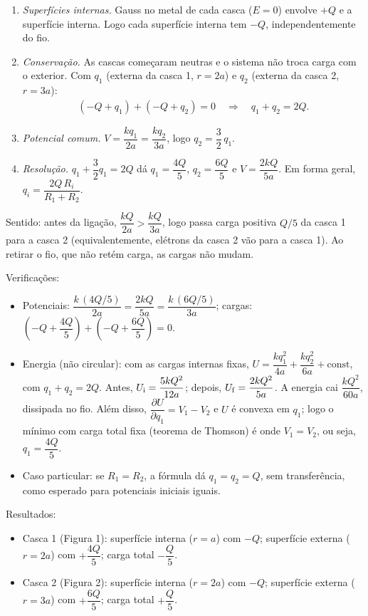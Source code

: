 \documentclass{article}%
\begin{document}
\begin{enumerate}
\item \emph{Superfícies internas.} Gauss no metal de cada casca ($E=0$) envolve $+Q$ e a superfície interna. Logo cada superfície interna tem $-Q$, independentemente do fio.
\item \emph{Conservação.} As cascas começaram neutras e o sistema não troca carga com o exterior. Com $q_1$ (externa da casca 1, $r=2a$) e $q_2$ (externa da casca 2, $r=3a$):
\begin{align*}
(-Q+q_1)+(-Q+q_2)=0 \quad\Rightarrow\quad q_1+q_2=2Q.
\end{align*}
\item \emph{Potencial comum.} $V=\dfrac{kq_1}{2a}=\dfrac{kq_2}{3a}$, logo $q_2=\dfrac32\,q_1$.
\item \emph{Resolução.} $q_1+\dfrac32 q_1=2Q$ dá $q_1=\dfrac{4Q}{5}$, $q_2=\dfrac{6Q}{5}$ e $V=\dfrac{2kQ}{5a}$. Em forma geral, $q_i=\dfrac{2Q\,R_i}{R_1+R_2}$.
\end{enumerate}

Sentido: antes da ligação, $\dfrac{kQ}{2a}>\dfrac{kQ}{3a}$, logo passa carga positiva $Q/5$ da casca 1 para a casca 2 (equivalentemente, elétrons da casca 2 vão para a casca 1). Ao retirar o fio, que não retém carga, as cargas não mudam.

Verificações:
\begin{itemize}
\item Potenciais: $\dfrac{k\,(4Q/5)}{2a}=\dfrac{2kQ}{5a}=\dfrac{k\,(6Q/5)}{3a}$; cargas: $\left(-Q+\dfrac{4Q}{5}\right)+\left(-Q+\dfrac{6Q}{5}\right)=0$.
\item Energia (não circular): com as cargas internas fixas, $U=\dfrac{kq_1^2}{4a}+\dfrac{kq_2^2}{6a}+\text{const}$, com $q_1+q_2=2Q$. Antes, $U_{\rm i}=\dfrac{5kQ^2}{12a}$; depois, $U_{\rm f}=\dfrac{2kQ^2}{5a}$. A energia cai $\dfrac{kQ^2}{60a}$, dissipada no fio. Além disso, $\dfrac{\partial U}{\partial q_1}=V_1-V_2$ e $U$ é convexa em $q_1$; logo o mínimo com carga total fixa (teorema de Thomson) é onde $V_1=V_2$, ou seja, $q_1=\dfrac{4Q}{5}$.
\item Caso particular: se $R_1=R_2$, a fórmula dá $q_1=q_2=Q$, sem transferência, como esperado para potenciais iniciais iguais.
\end{itemize}

Resultados:
\begin{itemize}
\item Casca 1 (Figura 1): superfície interna ($r=a$) com $-Q$; superfície externa ($r=2a$) com $+\dfrac{4Q}{5}$; carga total $-\dfrac{Q}{5}$.
\item Casca 2 (Figura 2): superfície interna ($r=2a$) com $-Q$; superfície externa ($r=3a$) com $+\dfrac{6Q}{5}$; carga total $+\dfrac{Q}{5}$.
\end{itemize}
\end{document}
